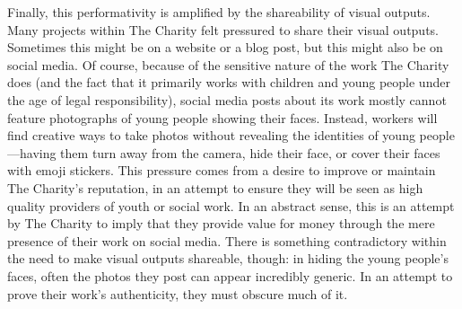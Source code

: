 Finally, this performativity is amplified by the shareability of visual outputs. Many projects within The Charity felt pressured to share their visual outputs. Sometimes this might be on a website or a blog post, but this might also be on social media. Of course, because of the sensitive nature of the work The Charity does (and the fact that it primarily works with children and young people under the age of legal responsibility), social media posts about its work mostly cannot feature photographs of young people showing their faces. Instead, workers will find creative ways to take photos without revealing the identities of young people—having them turn away from the camera, hide their face, or cover their faces with emoji stickers. This pressure comes from a desire to improve or maintain The Charity's reputation, in an attempt to ensure they will be seen as high quality providers of youth or social work. In an abstract sense, this is an attempt by The Charity to imply that they provide value for money through the mere presence of their work on social media. There is something contradictory within the need to make visual outputs shareable, though: in hiding the young people's faces, often the photos they post can appear incredibly generic. In an attempt to prove their work's authenticity, they must obscure much of it.

